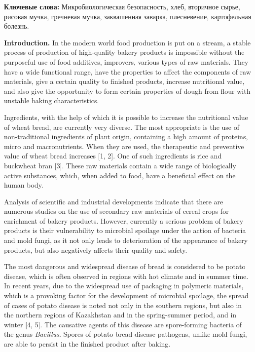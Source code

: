 {\bfseries Ключевые слова:} Микробиологическая безопасность, хлеб,
вторичное сырье, рисовая мучка, гречневая мучка, заквашенная заварка,
плесневение, картофельная болезнь.

\begin{multicols}{2}
{\bfseries Introduction.} In the modern world food production is put on a
stream, a stable process of production of high-quality bakery products
is impossible without the purposeful use of food additives, improvers,
various types of raw materials. They have a wide functional range, have
the properties to affect the components of raw materials, give a certain
quality to finished products, increase nutritional value, and also give
the opportunity to form certain properties of dough from flour with
unstable baking characteristics.

Ingredients, with the help of which it is possible to increase the
nutritional value of wheat bread, are currently very diverse. The most
appropriate is the use of non-traditional ingredients of plant origin,
containing a high amount of proteins, micro and macronutrients. When
they are used, the therapeutic and preventive value of wheat bread
increases {[}1, 2{]}. One of such ingredients is rice and buckwheat bran
{[}3{]}. These raw materials contain a wide range of biologically active
substances, which, when added to food, have a beneficial effect on the
human body.

Analysis of scientific and industrial developments indicate that there
are numerous studies on the use of secondary raw materials of cereal
crops for enrichment of bakery products. However, currently a serious
problem of bakery products is their vulnerability to microbial spoilage
under the action of bacteria and mold fungi, as it not only leads to
deterioration of the appearance of bakery products, but also negatively
affects their quality and safety.

The most dangerous and widespread disease of bread is considered to be
potato disease, which is often observed in regions with hot climate and
in summer time. In recent years, due to the widespread use of packaging
in polymeric materials, which is a provoking factor for the development
of microbial spoilage, the spread of cases of potato disease is noted
not only in the southern regions, but also in the northern regions of
Kazakhstan and in the spring-summer period, and in winter {[}4, 5{]}.
The causative agents of this disease are spore-forming bacteria of the
genus \emph{Bacillus}. Spores of potato bread disease pathogens, unlike
mold fungi, are able to persist in the finished product after baking.


\end{multicols}
